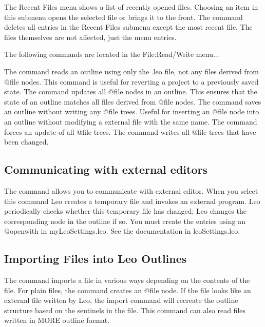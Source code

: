 \documentclass[a4paper,10pt,english]{sphinxmanual}
\begin{document}
The Recent Files menu shows a list of recently opened files. Choosing an
item in this submenu opens the selected file or brings it to the front. The
 command deletes all entries in the Recent Files
submenu except the most recent file. The files themselves are not affected,
just the menu entries.

The following commands are located in the File:Read/Write menu...

The  command reads an outline using only the .leo
file, not any files derived from @file nodes. This command is useful for
reverting a project to a previously saved state. The 
command updates all @file nodes in an outline. This ensures that the state
of an outline matches all files derived from @file nodes. The
 command saves an outline without writing any @file
trees. Useful for inserting an @file node into an outline without modifying
a external file with the same name. The  command
forces an update of all @file trees. The 
command writes all @file trees that have been changed.


\subsection{Communicating with external editors}
\label{commands:communicating-with-external-editors}
The  command allows you to communicate with external editor.
When you select this command Leo creates a temporary file and invokes an
external program. Leo periodically checks whether this temporary file has
changed; Leo changes the corresponding node in the outline if so. You must
create the entries using an @openwith in myLeoSettings.leo. See the
documentation in leoSettings.leo.


\subsection{Importing Files into Leo Outlines}
\label{commands:importing-files-into-leo-outlines}
The  command imports a file in various ways depending on the
contents of the file. For plain files, the command creates an @file node.
If the file looks like an external file written by Leo, the import command
will recreate the outline structure based on the sentinels in the file.
This command can also read files written in MORE outline format.
\end{document}
